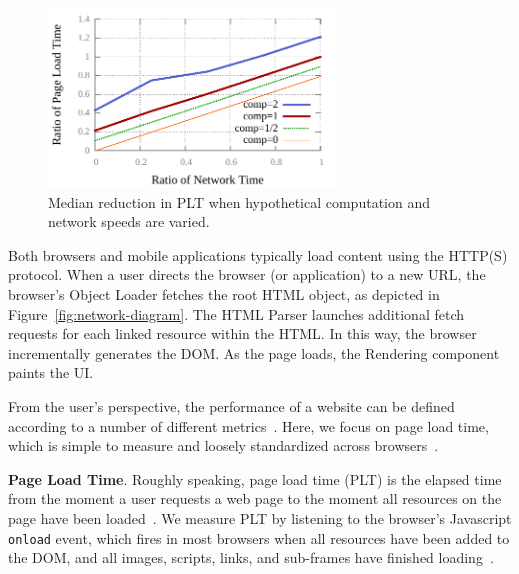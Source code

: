 \begin{figure}[t]
    \includegraphics[width=3in]{../graphs/whatif/ilivid2.pdf}
    \caption[]{\label{fig:whatif}Median reduction in PLT
    when hypothetical computation and network speeds are varied.}
\end{figure}
Both browsers and mobile applications typically load content using the HTTP(S) protocol. When a user directs the browser (or application) to a new URL, the browser's Object Loader fetches the root HTML object, as depicted
in Figure~\ref{fig:network-diagram}. The HTML Parser launches additional
fetch requests for each linked resource within the HTML. In this way, the browser incrementally generates the DOM.
As the page loads, the Rendering component paints the UI.

From the user's perspective, the performance of a website can be defined according to a number of different metrics~\cite{above-the-fold,speed-index}. Here,
we focus on page load time, which is simple to measure
and loosely standardized across browsers~\cite{w3c-onload}.

\textbf{Page Load Time}. Roughly speaking, page load time (PLT) is the elapsed time from the moment a user requests a web page to the moment all resources on the page have been loaded~\cite{page-speed}.
We measure PLT by listening to the browser's Javascript \texttt{onload} event,
which fires in most browsers when all resources have been added to the DOM, and all images,
scripts, links, and sub-frames have finished loading~\cite{w3c-onload}.


